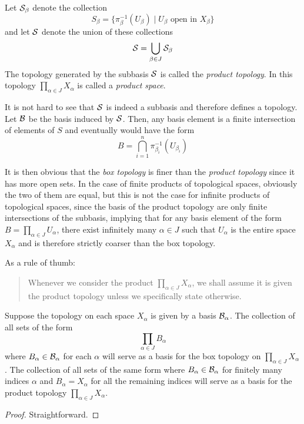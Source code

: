 \begin{definition}
    Let $\S_\beta$ denote the collection 
    \begin{equation*}
        S_\beta = \{\pi_\beta^{-1}(U_\beta)\mid \text{$U_\beta$ open in $X_\beta$}\}
    \end{equation*}
    and let $\S$ denote the union of these collections 
    \begin{equation*}
        \S = \bigcup_{\beta\in J}\S_\beta
    \end{equation*}
    The topology generated by the subbasis $\S$ is called the \textit{product topology}. In this topology $\prod_{\alpha\in J}X_\alpha$ is called a \textit{product space}.
\end{definition}

It is not hard to see that $\S$ is indeed a subbasis and therefore defines a topology. Let $\B$ be the basis induced by $\S$. Then, any basis element is a finite intersection of elements of $S$ and eventually would have the form 
\begin{equation*}
    B = \bigcap_{i=1}^n\pi_{\beta_i}^{-1}(U_{\beta_i})
\end{equation*}

It is then obvious that the \textit{box topology} is finer than the \textit{product topology} since it has more open sets. In the case of finite products of topological spaces, obviously the two of them are equal, but this is not the case for infinite products of topological spaces, since the basis of the product topology are only finite intersections of the subbasis, implying that for any basis element of the form $B = \prod_{\alpha\in J}U_\alpha$, there exist infinitely many $\alpha\in J$ such that $U_\alpha$ is the entire space $X_\alpha$ and is therefore strictly coarser than the box topology.

As a rule of thumb:
\begin{quotation}
    Whenever we consider the product $\prod_{\alpha\in J}X_\alpha$, we shall assume it is given the product topology unless we specifically state otherwise.
\end{quotation}

\begin{theorem}
    Suppose the topology on each space $X_\alpha$ is given by a basis $\B_\alpha$. The collection of all sets of the form 
    \begin{equation*}
        \prod_{\alpha\in J}B_\alpha
    \end{equation*}
    where $B_\alpha\in\B_\alpha$ for each $\alpha$ will serve as a basis for the box topology on $\prod_{\alpha\in J}X_\alpha$. The collection of all sets of the same form where $B_\alpha\in\B_\alpha$ for finitely many indices $\alpha$ and $B_\alpha = X_\alpha$ for all the remaining indices will serve as a basis for the product topology $\prod_{\alpha\in J}X_\alpha$.
\end{theorem}
\begin{proof}
    Straightforward.
\end{proof}

